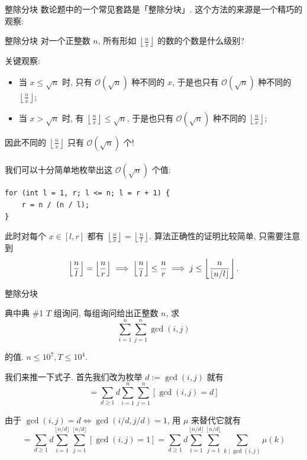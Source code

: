 \documentclass{beamer}
\newcommand{\nl}{\\\hspace*{\fill}\\}
\begin{document}
    \begin{frame}[fragile]{整除分块}
        数论题中的一个常见套路是「整除分块」. 这个方法的来源是一个精巧的观察:
        \begin{block}{整除分块}
            对一个正整数 $n$, 所有形如 $\left\lfloor\frac nx\right\rfloor$ 的数的个数是什么级别?
        \end{block}
        \pause
        关键观察:
        \begin{itemize}
            \item 当 $x\leq\sqrt n$ 时, 只有 $\mathcal O(\sqrt n)$ 种不同的 $x$, 于是也只有 $\mathcal O(\sqrt n)$ 种不同的 $\left\lfloor\frac nx\right\rfloor$;
            \item 当 $x>\sqrt n$ 时, 有 $\left\lfloor\frac nx\right\rfloor\leq\sqrt n$, 于是也只有 $\mathcal O(\sqrt n)$ 种不同的 $\left\lfloor\frac nx\right\rfloor$;
        \end{itemize}
        因此不同的 $\left\lfloor\frac nx\right\rfloor$ 只有 $\mathcal O(\sqrt n)$ 个!\nl
        我们可以十分简单地枚举出这 $\mathcal O(\sqrt n)$ 个值:
        \begin{lstlisting}
for (int l = 1, r; l <= n; l = r + 1) {
    r = n / (n / l);
}\end{lstlisting}
        此时对每个 $x\in[l,r]$ 都有 $\left\lfloor\frac nx\right\rfloor=\left\lfloor\frac nl\right\rfloor$. 算法正确性的证明比较简单, 只需要注意到
        $$
        \left\lfloor\frac nl\right\rfloor=\left\lfloor\frac nr\right\rfloor\implies\left\lfloor\frac nl\right\rfloor\leq\frac nr\implies j\leq\left\lfloor n\over\lfloor n/l\rfloor\right\rfloor.
        $$
    \end{frame}

    \begin{frame}{整除分块}
        \begin{block}{典中典 \#1}
            $T$ 组询问, 每组询问给出正整数 $n$, 求
            $$
            \sum_{i=1}^n\sum_{j=1}^n\gcd(i,j)
            $$

            的值. $n\leq 10^7,T\leq 10^4$.
        \end{block}
        \pause
        我们来推一下式子. 首先我们改为枚举 $d:=\gcd(i,j)$ 就有
        $$
        =\sum_{d\geq 1}d\sum_{i=1}^n\sum_{j=1}^n[\gcd(i,j)=d]
        $$

        由于 $\gcd(i,j)=d\iff\gcd(i/d,j/d)=1$, 用 $\mu$ 来替代它就有
        $$
        =\sum_{d\geq 1}d\sum_{i=1}^{\lfloor n/d\rfloor}\sum_{j=1}^{\lfloor n/d\rfloor}[\gcd(i,j)=1]=\sum_{d\geq 1}d\sum_{i=1}^{\lfloor n/d\rfloor}\sum_{j=1}^{\lfloor n/d\lfloor}\sum_{k\mid\gcd(i,j)}\mu(k)
        $$
    \end{frame}
\end{document}
